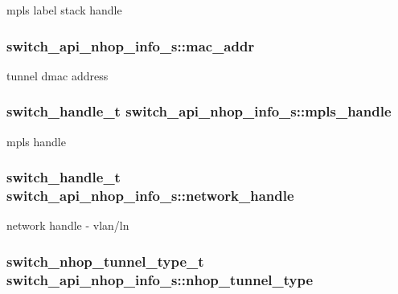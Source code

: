 mpls label stack handle \hypertarget{structswitch__api__nhop__info__s_a677e98056efa96a4b6a9a3b243337473}{
\subsubsection[{mac\+\_\+addr}]{ switch\+\_\+api\+\_\+nhop\+\_\+info\+\_\+s\+::mac\+\_\+addr}}\label{structswitch__api__nhop__info__s_a677e98056efa96a4b6a9a3b243337473}
tunnel dmac address \hypertarget{structswitch__api__nhop__info__s_a19ad79761f0abeb8a535ce77b94a2743}{
\subsubsection[{mpls\+\_\+handle}]{\setlength{\rightskip}{0pt plus 5cm}switch\+\_\+handle\+\_\+t switch\+\_\+api\+\_\+nhop\+\_\+info\+\_\+s\+::mpls\+\_\+handle}}\label{structswitch__api__nhop__info__s_a19ad79761f0abeb8a535ce77b94a2743}
mpls handle \hypertarget{structswitch__api__nhop__info__s_aef8cdac12a70bd9ff6ee3cfa837ae48d}{
\subsubsection[{network\+\_\+handle}]{\setlength{\rightskip}{0pt plus 5cm}switch\+\_\+handle\+\_\+t switch\+\_\+api\+\_\+nhop\+\_\+info\+\_\+s\+::network\+\_\+handle}}\label{structswitch__api__nhop__info__s_aef8cdac12a70bd9ff6ee3cfa837ae48d}
network handle -\/ vlan/ln \hypertarget{structswitch__api__nhop__info__s_ac62ded2a49a21c23bac8c0dd876e13a4}{
\subsubsection[{nhop\+\_\+tunnel\+\_\+type}]{\setlength{\rightskip}{0pt plus 5cm}switch\+\_\+nhop\+\_\+tunnel\+\_\+type\+\_\+t switch\+\_\+api\+\_\+nhop\+\_\+info\+\_\+s\+::nhop\+\_\+tunnel\+\_\+type}}\label{structswitch__api__nhop__info__s_ac62ded2a49a21c23bac8c0dd876e13a4}

